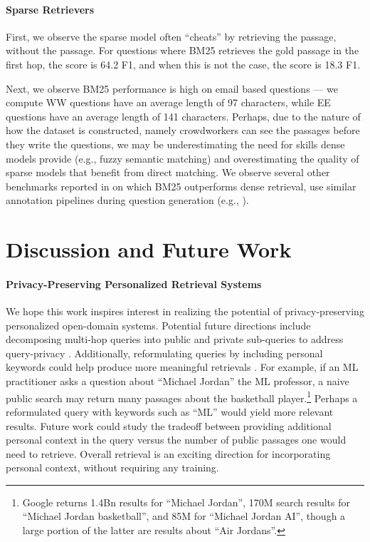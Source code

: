 \documentclass{article}
\renewcommand\cite{\citep}	\newcommand\shortcite{\citeyearpar}\newcommand\newcite{\citet}
\begin{document}
\paragraph{Sparse Retrievers} First, we observe the sparse model often ``cheats'' by retrieving the  passage, without the  passage. For questions where BM25 retrieves the gold  passage in the first hop, the score is 64.2 F1, and when this is not the case, the score is 18.3 F1. 

Next, we observe BM25 performance is high on email based questions --- we compute WW questions have an average length of 97 characters, while EE questions have an average length of 141 characters. Perhaps, due to the nature of how the dataset is constructed, namely crowdworkers can see the passages before they write the questions, we may be underestimating the need for skills dense models provide (e.g., fuzzy semantic matching)  and overestimating the quality of sparse models that benefit from direct matching. We observe several other benchmarks reported in \cite{thakur2021beir} on which BM25 outperforms dense retrieval, use similar annotation pipelines during question generation (e.g., \citet{wadden2020factorfiction, yang2018hotpotqa}). 



 





\section{Discussion and Future Work}
\paragraph{Privacy-Preserving Personalized Retrieval Systems} We hope this work inspires interest in realizing the potential of privacy-preserving personalized open-domain systems. Potential future directions include decomposing multi-hop queries into public and private sub-queries to address query-privacy \cite{min2019multihopdecomp, perez2020qadecomp}. Additionally, reformulating queries by including personal keywords could help produce more meaningful retrievals \cite{carpineto2012aqe}. For example, if an ML practitioner asks a question about ``Michael Jordan'' the ML professor, a naive public search may return many passages about the basketball player.\footnote{Google returns 1.4Bn results for ``Michael Jordan'', 170M search results for ``Michael Jordan basketball'', and 85M for ``Michael Jordan AI'', though a large portion of the latter are results about ``Air Jordans''.} Perhaps a reformulated query with keywords such as ``ML'' would yield more relevant results. Future work could study the tradeoff between providing additional personal context in the query versus the number of public passages one would need to retrieve. Overall retrieval is an exciting direction for incorporating personal context, without requiring any training.
\end{document}
